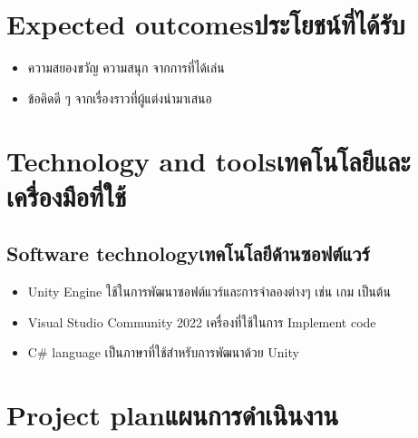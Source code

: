 
\section{\ifenglish Expected outcomes\else ประโยชน์ที่ได้รับ\fi}
\begin{itemize}
    \item ความสยองขวัญ ความสนุก จากการที่ได้เล่น
    \item ข้อคิดดี ๆ จากเรื่องราวที่ผู้แต่งนำมาเสนอ
\end{itemize}

\section{\ifenglish Technology and tools\else เทคโนโลยีและเครื่องมือที่ใช้\fi}


\subsection{\ifenglish Software technology\else เทคโนโลยีด้านซอฟต์แวร์\fi}
\begin{itemize}
    \item Unity Engine ใช้ในการพัฒนาซอฟต์แวร์และการจำลองต่างๆ เช่น เกม เป็นต้น
    \item Visual Studio Community 2022 เครื่องที่ใช้ในการ Implement code
    \item C$\#$ language เป็นภาษาที่ใช้สำหรับการพัฒนาด้วย Unity
\end{itemize}

\section{\ifenglish Project plan\else แผนการดำเนินงาน\fi}

